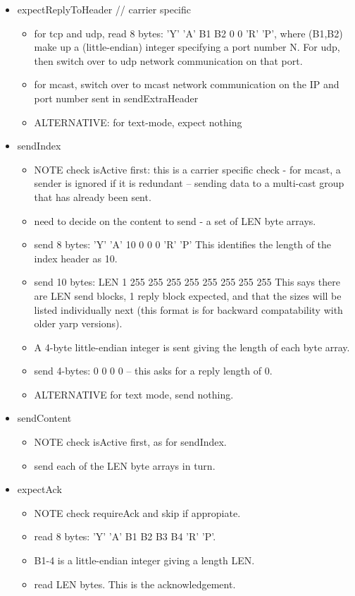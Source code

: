\documentclass[a4]{article}
\begin{document}
\begin{itemize}
  \item expectReplyToHeader    // carrier specific
    \begin{itemize}
      \item for tcp and udp, read 8 bytes:  'Y' 'A' B1 B2 0 0 'R' 'P', where
	(B1,B2) make up a (little-endian) integer specifying a port number N.
	For udp, then switch over to udp network communication on that port.
      \item for mcast, switch over to mcast network communication on the IP and
	port number sent in sendExtraHeader
      \item ALTERNATIVE: for text-mode, expect nothing
    \end{itemize}

  \item sendIndex

    \begin{itemize}
    \item NOTE check isActive first: this is a carrier specific check
    - for mcast, a sender is ignored if it is redundant -- sending
    data to a multi-cast group that has already been sent.
    \item need to decide on the content to send - a set of LEN byte arrays.
    \item send 8 bytes: 'Y' 'A' 10 0 0 0 'R' 'P'
      This identifies the length of the index header as 10.
    \item send 10 bytes: LEN 1   255 255 255 255  255 255 255 255
      This says there are LEN send blocks, 1 reply block expected,
      and that the sizes will be listed individually next (this
      format is for backward compatability with older yarp versions).
    \item A 4-byte little-endian integer is sent giving the length of
      each byte array.
    \item send 4-bytes: 0 0 0 0 -- this asks for a reply length of 0.
    \item ALTERNATIVE for text mode, send nothing.
    \end{itemize}

  \item sendContent

    \begin{itemize}
      \item NOTE check isActive first, as for sendIndex.
      \item send each of the LEN byte arrays in turn.
    \end{itemize}

  \item expectAck
    \begin{itemize}
    \item NOTE check requireAck and skip if appropiate.
    \item read 8 bytes: 'Y' 'A' B1 B2 B3 B4 'R' 'P'.
    \item B1-4 is a little-endian integer giving a length LEN.
    \item read LEN bytes.  This is the acknowledgement.
    \end{itemize}
\end{itemize}
\end{document}
